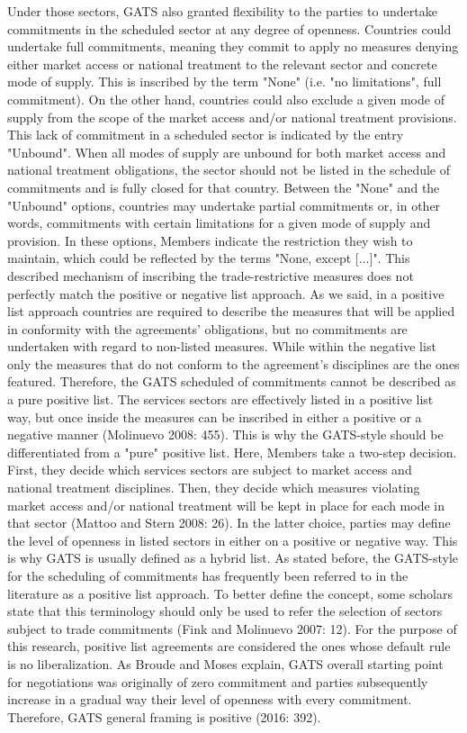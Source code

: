 \documentclass{article}
\begin{document}
Under those sectors, GATS also granted flexibility to the parties to undertake commitments in the scheduled sector at any degree of openness. Countries could undertake full commitments, meaning they commit to apply no measures denying either market access or national treatment to the relevant sector and concrete mode of supply. This is inscribed by the term "None" (i.e. "no limitations", full commitment). On the other hand, countries could also exclude a given mode of supply from the scope of the market access and/or national treatment provisions. This lack of commitment in a scheduled sector is indicated by the entry "Unbound". When all modes of supply are unbound for both market access and national treatment obligations, the sector should not be listed in the schedule of commitments and is fully closed for that country. Between the "None" and the "Unbound" options, countries may undertake partial commitments or, in other words, commitments with certain limitations for a given mode of supply and provision. In these options, Members indicate the restriction they wish to maintain, which could be reflected by the terms "None, except [$\ldots$]". This described mechanism of inscribing the trade-restrictive measures does not perfectly match the positive or negative list approach. As we said, in a positive list approach countries are required to describe the measures that will be applied in conformity with the agreements’ obligations, but no commitments are undertaken with regard to non-listed measures. While within the negative list only the measures that do not conform to the agreement’s disciplines are the ones featured. Therefore, the GATS scheduled of commitments cannot be described as a pure positive list. The services sectors are effectively listed in a positive list way, but once inside the measures can be inscribed in either a positive or a negative manner (Molinuevo 2008: 455). This is why the GATS-style should be differentiated from a "pure" positive list. Here, Members take a two-step decision. First, they decide which services sectors are subject to market access and national treatment disciplines. Then, they decide which measures violating market access and/or national treatment will be kept in place for each mode in that sector (Mattoo and Stern 2008: 26). In the latter choice, parties may define the level of openness in listed sectors in either on a positive or negative way. This is why GATS is usually defined as a hybrid list. As stated before, the GATS-style for the scheduling of commitments has frequently been referred to in the literature as a positive list approach. To better define the concept, some scholars state that this terminology should only be used to refer the selection of sectors subject to trade commitments (Fink and Molinuevo 2007: 12). For the purpose of this research, positive list agreements are considered the ones whose default rule is no liberalization. As Broude and Moses explain, GATS overall starting point for negotiations was originally of zero commitment and parties subsequently increase in a gradual way their level of openness with every commitment. Therefore, GATS general framing is positive (2016: 392).
\end{document}
